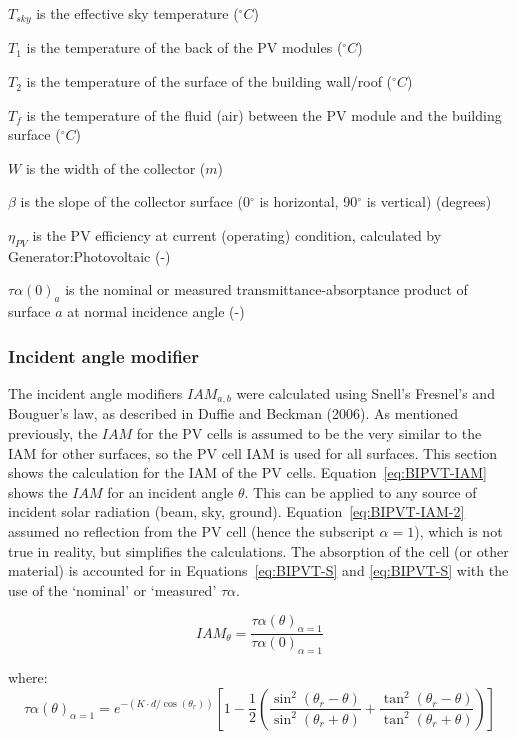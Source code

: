 \(T_{sky}\) is the effective sky temperature (\(^{\circ}C\))

\(T_{1}\) is the temperature of the back of the PV modules (\(^{\circ}C\))

\(T_{2}\) is the temperature of the surface of the building wall/roof (\(^{\circ}C\))

\(T_{f}\) is the temperature of the fluid (air) between the PV module and the building surface (\(^{\circ}C\))

\(W\) is the width of the collector (\(m\))

\(\beta\) is the slope of the collector surface (0\(^{\circ}\) is horizontal, 90\(^{\circ}\) is vertical) (degrees)

\(\eta_{PV}\) is the PV efficiency at current (operating) condition, calculated by Generator:Photovoltaic (-)

\(\tau\alpha (0)_{a}\) is the nominal or measured transmittance-absorptance product of surface \(a\) at normal incidence angle (-)

\subsubsection{Incident angle modifier}\label{BIPVT-IAM}

The incident angle modifiers \(IAM_{a,b}\) were calculated using Snell's Fresnel's and Bouguer's law, as described in Duffie and Beckman (2006). As mentioned previously, the \(IAM\) for the PV cells is assumed to be the very similar to the IAM for other surfaces, so the PV cell IAM is used for all surfaces. This section shows the calculation for the IAM of the PV cells. Equation~\ref{eq:BIPVT-IAM} shows the \(IAM\) for an incident angle \(\theta\). This can be applied to any source of incident solar radiation (beam, sky, ground). Equation~\ref{eq:BIPVT-IAM-2} assumed no reflection from the PV cell (hence the subscript \(\alpha=1\)), which is not true in reality, but simplifies the calculations. The absorption of the cell (or other material) is accounted for in Equations~\ref{eq:BIPVT-S} and \ref{eq:BIPVT-S} with the use of the `nominal' or `measured' \(\tau\alpha\).

\begin{equation}
IAM_{\theta}=\frac{\tau\alpha(\theta)_{\alpha=1}}{\tau\alpha(0)_{\alpha=1}}
\label{eq:BIPVT-IAM}
\end{equation}

where:
\begin{equation}
\tau\alpha(\theta)_{\alpha=1}=e^{-\left(K\cdot d/\cos\left(\theta_{r}\right)\right)}\left[1-\frac{1}{2}\left(\frac{\sin^{2}(\theta_{r}-\theta)}{\sin^{2}(\theta_{r}+\theta)}+\frac{\tan^{2}(\theta_{r}-\theta)}{\tan^{2}(\theta_{r}+\theta)}\right)\right]
\label{eq:BIPVT-IAM-2}
\end{equation}

